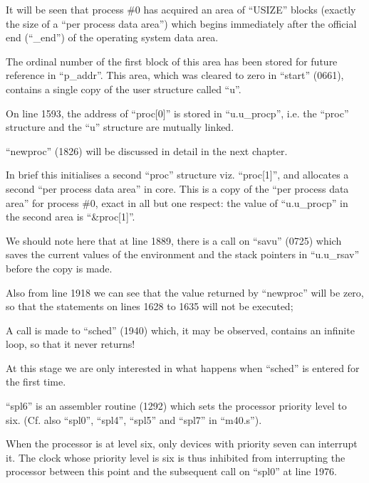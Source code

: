 It will be seen that process \#0 has
acquired an area of ``USIZE'' blocks
(exactly the size of a ``per process
data area'') which begins immediately
after the official end (``\_end'') of the
operating system data area.

The ordinal number of the first block
of this area has been stored for future
reference in ``p\_addr''. This area,
which was cleared to zero in ``start''
(0661), contains a single copy of the
user structure called ``u''.

On line 1593, the address of ``proc[0]''
is stored in ``u.u\_procp'', i.e. the
``proc'' structure and the ``u'' structure
are mutually linked.



\bd
\item[1627:] ``newproc'' (1826) will be discussed in detail in the next
 chapter.

In brief this initialises a
second ``proc'' structure viz.
``proc[1]'', and allocates a second
``per process data area'' in core.
This is a copy of the ``per process data area'' for process \#0,
exact in all but one respect: the
value of ``u.u\_procp'' in the
second area is ``\&proc[1]''.

We should note here that at line
1889, there is a call on ``savu''
(0725) which saves the current
values of the environment and the
stack pointers in ``u.u\_rsav''
before the copy is made.

Also from line 1918 we can see
that the value returned by
``newproc'' will be zero, so that
the statements on lines 1628 to
1635 will not be executed;

\item[1637:] A call is made to ``sched'' (1940)
 which, it may be observed, contains an infinite loop, so that
 it never returns!
\ed


At this stage we are only interested in
what happens when ``sched'' is entered
for the first time.

\bd
\item[1958:] ``spl6'' is an assembler routine
 (1292) which sets the processor
 priority level to six. (Cf. also
 ``spl0'', ``spl4'', ``spl5'' and ``spl7''
 in ``m40.s'').
\ed

When the processor is at level six,
only devices with priority seven can
interrupt it. The clock whose priority
level is six is thus inhibited from
interrupting the processor between this
point and the subsequent call on ``spl0''
at line 1976.

